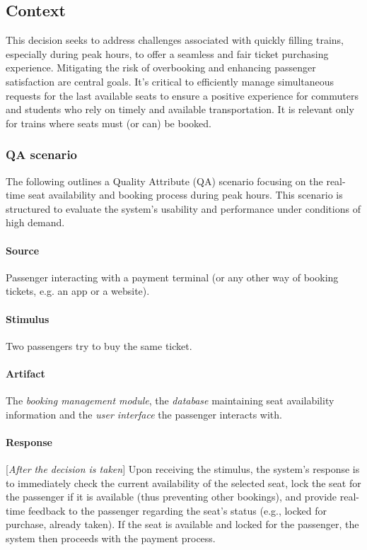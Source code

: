 \subsection*{Context}
This decision seeks to address challenges associated with quickly filling trains, especially during peak hours, to offer a seamless and fair ticket purchasing experience. Mitigating the risk of overbooking and enhancing passenger satisfaction are central goals. It's critical to efficiently manage simultaneous requests for the last available seats to ensure a positive experience for commuters and students who rely on timely and available transportation.
It is relevant only for trains where seats must (or can) be booked.

\subsubsection*{QA scenario}
The following outlines a Quality Attribute (QA) scenario focusing on the real-time seat availability and booking process during peak hours. This scenario is structured to evaluate the system's usability and performance under conditions of high demand.
\paragraph{Source} Passenger interacting with a payment terminal (or any other way of booking tickets, e.g. an app or a website).
\paragraph{Stimulus} Two passengers try to buy the same ticket.
\paragraph{Artifact} The \textit{booking management module}, the \textit{database} maintaining seat availability information and the \textit{user interface} the passenger interacts with.
\paragraph{Response}[\textit{After the decision is taken}] Upon receiving the stimulus, the system's response is to immediately check the current availability of the selected seat, lock the seat for the passenger if it is available (thus preventing other bookings), and provide real-time feedback to the passenger regarding the seat's status (e.g., locked for purchase, already taken). If the seat is available and locked for the passenger, the system then proceeds with the payment process.
